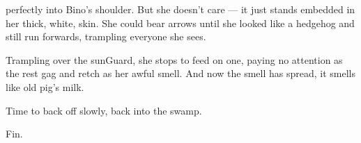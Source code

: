 perfectly into Bino's shoulder.
But she doesn't care --- it just stands embedded in her thick, white, skin.
She could bear arrows until she looked like a hedgehog and still run forwards, trampling everyone she sees.

Trampling over the \gls{sunGuard}, she stops to feed on one, paying no attention as the rest gag and retch as her awful smell.
And now the smell has spread, it smells like old pig's milk.

Time to back off slowly, back into the swamp.

Fin.
